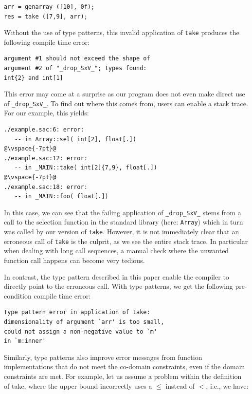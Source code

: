\documentclass[sigconf,screen]{acmart}
\begin{document}
\begin{lstlisting}
arr = genarray ([10], 0f);
res = take ([7,9], arr);
\end{lstlisting}

Without the use of type patterns, this invalid application of \texttt{take} produces the following compile time error:

\begin{lstlisting}[language=console]
argument #1 should not exceed the shape of
argument #2 of "_drop_SxV_"; types found:
int{2} and int[1]
\end{lstlisting}

This error may come at a surprise as our program does not even make direct use of \verb|_drop_SxV_|.
To find out where this comes from, users can enable a stack trace.
For our example, this yields:

\begin{lstlisting}[language=console,escapechar=@]
./example.sac:6: error:
   -- in Array::sel( int[2], float[.])
@\vspace{-7pt}@
./example.sac:12: error:
   -- in _MAIN::take( int[2]{7,9}, float[.])
@\vspace{-7pt}@
./example.sac:18: error:
   -- in _MAIN::foo( float[.])
\end{lstlisting}

In this case, we can see that the failing application of \verb|_drop_SxV_| stems from a call to the selection function in the standard library (here: \verb|Array|) which in turn was called by our version of \verb|take|.
However, it is not immediately clear that an erroneous call of \verb|take| is the culprit, as we see the entire stack trace.
In particular when dealing with long call sequences, a manual check where the unwanted function call happens can become very tedious.

In contrast, the type pattern described in this paper enable the compiler to directly point to the erroneous call.
With type patterns, we get the following pre-condition compile time error:

\begin{lstlisting}[language=console]
Type pattern error in application of take:
dimensionality of argument `arr' is too small,
could not assign a non-negative value to `m'
in `m:inner'
\end{lstlisting}

Similarly, type patterns also improve error messages from function implementations that do not meet the co-domain constraints, even if the domain constraints are met.
For example, let us assume a problem within the definition of take, where the upper bound incorrectly uses a $\leq$ instead of $<$, i.e., we have:
\end{document}
